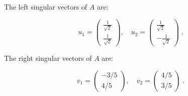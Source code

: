 \documentclass[11pt]{article}
\begin{document}
The left singular vectors of $A$ are:

$$u_1 = \begin{pmatrix}
\frac{1}{\sqrt{2}} \\ \frac{1}{\sqrt{2}}
\end{pmatrix}, \quad u_2 = \begin{pmatrix}
\frac{1}{\sqrt{2}} \\ -\frac{1}{\sqrt{2}}
\end{pmatrix} \;.$$

The right singular vectors of $A$ are:

$$v_1 = \begin{pmatrix}
-3/5 \\ 4/5 
\end{pmatrix}, \quad v_2 = \begin{pmatrix}
4/5 \\ 3/5 
\end{pmatrix} \; .$$
\end{document}
